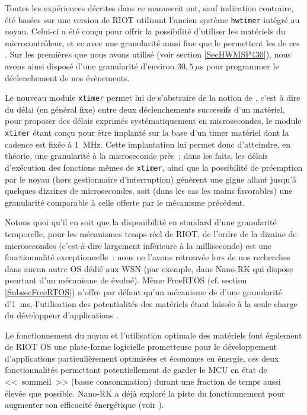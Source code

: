Toutes les expériences décrites dans ce manuscrit ont, sauf indication
contraire, été basées sur une version de RIOT utilisant l'ancien système
\texttt{hwtimer} intégré au noyau. Celui-ci a été conçu pour offrir
la possibilité d'utiliser les  matériels du microcontrôleur,
et ce avec une granularité aussi fine que le permettent les 
de ces . Sur les premières  que nous avons utilisé
(voir section \vref{SecHWMSP430}), nous avons ainsi disposé d'une granularité
d'environ $30,5~\mu$s pour programmer le déclenchement de nos évènements.

\medskip

Le nouveau module \texttt{xtimer} permet lui de s'abstraire de la notion
de , c'est à dire du délai (en général fixe) entre deux
déclenchements successifs d'un  matériel, pour proposer des
délais exprimés systématiquement en microsecondes, le module \texttt{xtimer}
étant conçu pour être implanté sur la base d'un timer matériel dont la
cadence est fixée à 1~MHz. Cette implantation lui permet donc d'atteindre,
en théorie, une granularité à la microseconde près~; dans les faits,
les délais d'exécution des fonctions mêmes de \texttt{xtimer}, ainsi que
la possibilité de préemption par le noyau (hors gestionnaire d'interruption)
génèrent une gigue allant jusqu'à quelques dizaines de microsecondes, soit
(dans les cas les moins favorables) une granularité comparable
à celle offerte par le mécanisme précédent.

Notons quoi qu'il en soit que la disponibilité en standard d'une granularité
temporelle, pour les mécanismes temps-réel de RIOT, de l'ordre de la dizaine
de microsecondes (c'est-à-dire largement inférieure à la milliseconde) 
est une fonctionnalité exceptionnelle~: nous ne l'avons retrouvée lors
de nos recherches dans aucun autre OS dédié aux WSN (par exemple, dans
Nano-RK \cite{NanoRKTimeMgt} qui dispose pourtant d'un mécanisme de
 évolué). Même FreeRTOS (cf. section \vref{SubsecFreeRTOS})
n'offre par défaut qu'un mécanisme de  d'une granularité
d'1~ms, l'utilisation des potentialités des  matériels étant
laissée à la seule charge du développeur d'applications
\cite{FreeRTOSTimerRes}.

Le fonctionnement  du noyau et l'utilisation optimale
des  matériels font également de RIOT OS une plate-forme
logicielle prometteuse pour le développement d'applications particulièrement
optimisées et économes en énergie, ces deux fonctionnalités permettant
potentiellement de garder le MCU en état de <<~sommeil~>> (basse
consommation) durant une fraction de temps aussi élevée que possible.
Nano-RK a déjà exploré la piste du fonctionnement  pour
augmenter son efficacité énergétique (voir \cite{NanoRKTimeMgt}).


